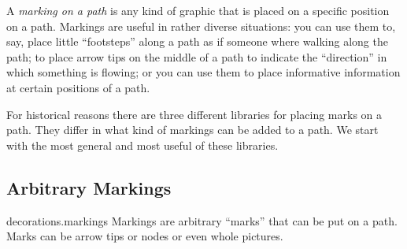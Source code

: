 A \emph{marking on a path} is any kind of graphic that is placed on a
specific position on a path. Markings are useful in rather diverse
situations: you can use them to, say, place little ``footsteps'' along
a path as if someone where walking along the path; to place arrow tips
on the middle of a path to indicate the ``direction'' in which
something is flowing; or you can use them to place informative
information at certain positions of a path.

For historical reasons there are three different libraries for placing
marks on a path. They differ in what kind of markings can be added to
a path. We start with the most general and most useful of these libraries.



\subsection{Arbitrary Markings}

\begin{pgflibrary}{decorations.markings}
  Markings are arbitrary ``marks'' that can be put on a path. Marks
  can be arrow tips or nodes or even whole pictures.
\end{pgflibrary}

